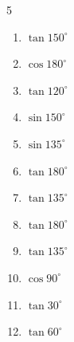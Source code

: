 \begin{multicols}{5}
\begin{enumerate}

  \item $\displaystyle \tan{150^\circ}$


  \item $\displaystyle \cos{180^\circ}$

        \phantom{$\displaystyle =-1$}

  \item $\displaystyle \tan{120^\circ}$


  \item $\displaystyle \sin{150^\circ}$


  \item $\displaystyle \sin{135^\circ}$


  \item $\displaystyle \tan{180^\circ}$

        \phantom{$\displaystyle =0$}

  \item $\displaystyle \tan{135^\circ}$

        \phantom{$\displaystyle =-1$}

\columnbreak %

  \item $\displaystyle \tan{180^\circ}$

        \phantom{$\displaystyle =0$}

  \item $\displaystyle \tan{135^\circ}$

        \phantom{$\displaystyle =-1$}

  \item $\displaystyle \cos{90^\circ}$

        \phantom{$\displaystyle =0$}

  \item $\displaystyle \tan{30^\circ}$


  \item $\displaystyle \tan{60^\circ}$



\end{enumerate}
\end{multicols}
